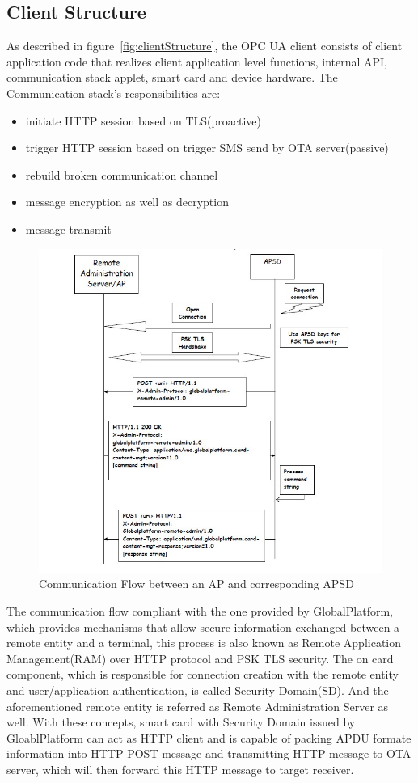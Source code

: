 \subsection{Client Structure}
As described in figure~\ref{fig:clientStructure}, the OPC UA client consists of client application code that realizes client application level functions, internal API, communication stack applet, smart card and device hardware. The Communication stack's responsibilities are:
\begin{itemize}
  \item initiate HTTP session based on TLS(proactive)
  \item trigger HTTP session based on trigger SMS send by OTA server(passive)
  \item rebuild broken communication channel
  \item message encryption as well as decryption
  \item message transmit
\end{itemize}

\begin{figure}
	\centering
	\includegraphics[width=1.2\textwidth]{apsd.jpg}
		\caption{Communication Flow between an AP and corresponding APSD\cite{ramGP}}
	\label{fig:apsd}
\end{figure}
The communication flow compliant with the one provided by GlobalPlatform, which provides mechanisms that allow secure information exchanged between a remote entity and a terminal, this process is also known as Remote Application Management(RAM) over HTTP protocol and PSK TLS security. The on card component, which is responsible for connection creation with the remote entity and user/application authentication, is called Security Domain(SD). And the aforementioned remote entity  is  referred as Remote Administration Server as well. With these concepts, smart card with Security Domain issued  by GloablPlatform can act as HTTP client and is capable of packing APDU formate information into HTTP POST message and transmitting HTTP message to OTA server, which will then forward this HTTP message to target receiver.\cite{ramGP}
 
